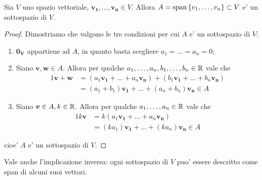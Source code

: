 \begin{proposition}
    Sia $V$ uno spazio vettoriale, $\bm{v_1}, \dots, \bm{v_n} \in V$. Allora $A = \operatorname{span}\left\{v_1, \dots, v_n\right\} \subset V$ e' un sottospazio di $V$.
\end{proposition}
\begin{proof}
    Dimostriamo che valgono le tre condizioni per cui $A$ e' un sottospazio di $V$:
    \begin{enumerate}
        \item $\bm{0_V}$ appartiene ad $A$, in quanto basta scegliere $a_1 = \dots = a_n = 0$;
        \item Siano $\bm{v}, \bm{w} \in A$. Allora per qualche $a_1, \dots, a_n, b_1, \dots, b_n \in \mathbb{R}$ vale che \begin{alignat*}{1}
            \bm{v} + \bm{w} &= (a_1\bm{v_1} + \dots + a_n\bm{v_n}) + (b_1\bm{v_1} + \dots + b_n\bm{v_n}) \\
            &= (a_1 + b_1)\bm{v_1} + \dots + (a_n + b_n)\bm{v_n} \in A
        \end{alignat*}
        \item Siano $\bm{v} \in A, k \in \mathbb{R}$. Allora per qualche $a_1, \dots, a_n \in \mathbb{R}$ vale che \begin{alignat*}{1}
            k\bm{v} &= k(a_1\bm{v_1} + \dots + a_n\bm{v_n})  \\
            &= (ka_1)\bm{v_1} + \dots + (ka_n)\bm{v_n} \in A
        \end{alignat*}
    \end{enumerate}
    cioe' $A$ e' un sottospazio di $V$.
\end{proof}

Vale anche l'implicazione inversa: ogni sottospazio di $V$ puo' essere descritto come span di alcuni suoi vettori.

